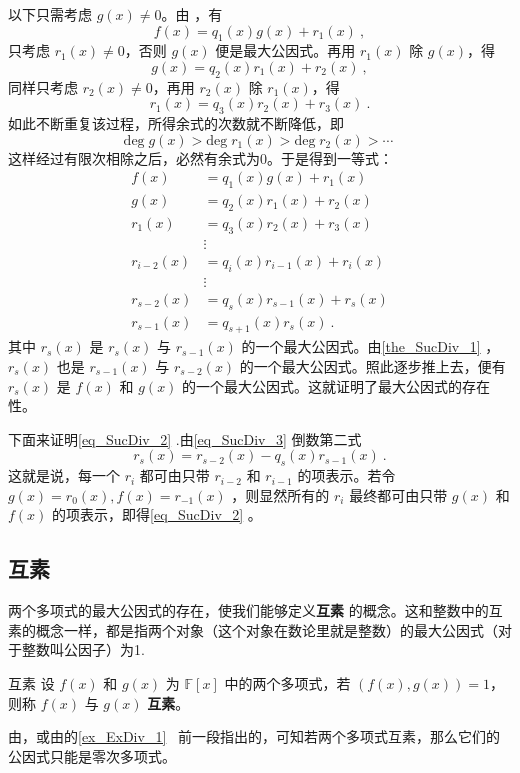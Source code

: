 以下只需考虑 $g(x)\neq 0$。由 ，有
\begin{equation}
f(x)=q_1(x)g(x)+r_1(x)~,
\end{equation}
只考虑 $r_1(x)\neq 0$，否则 $g(x)$ 便是最大公因式。再用 $r_1(x)$ 除 $g(x)$，得
\begin{equation}
g(x)=q_2(x)r_1(x)+r_2(x)~,
\end{equation}
同样只考虑 $r_2(x)\neq0$，再用 $r_2(x)$ 除 $r_1(x)$，得
\begin{equation}
r_1(x)=q_3(x)r_2(x)+r_3(x)~.
\end{equation}
如此不断重复该过程，所得余式的次数就不断降低，即
\begin{equation}
\mathrm{deg}\;g(x)>\mathrm{deg}\;r_1(x)>\mathrm{deg}\;r_2(x)>\cdots~
\end{equation}
这样经过有限次相除之后，必然有余式为0。于是得到一等式：
\begin{equation}\label{eq_SucDiv_3}
\begin{aligned}
f(x)&=q_1(x)g(x)+r_1(x)\\
g(x)&=q_2(x)r_1(x)+r_2(x)\\
r_1(x)&=q_3(x)r_2(x)+r_3(x)\\
&\vdots\\
r_{i-2}(x)&=q_i(x)r_{i-1}(x)+r_i(x)\\
&\vdots\\
r_{s-2}(x)&=q_s(x)r_{s-1}(x)+r_s(x)\\
r_{s-1}(x)&=q_{s+1}(x)r_s(x)~.
\end{aligned}
\end{equation}
其中 $r_s(x)$ 是 $r_s(x)$ 与 $r_{s-1}(x)$ 的一个最大公因式。由\autoref{the_SucDiv_1} ，$r_s(x)$ 也是 $r_{s-1}(x)$ 与 $r_{s-2}(x)$ 的一个最大公因式。照此逐步推上去，便有 $r_s(x)$ 是 $f(x)$ 和 $g(x)$ 的一个最大公因式。这就证明了最大公因式的存在性。

下面来证明\autoref{eq_SucDiv_2} .由\autoref{eq_SucDiv_3} 倒数第二式
\begin{equation}
r_s(x)=r_{s-2}(x)-q_s(x)r_{s-1}(x)~.
\end{equation}
这就是说，每一个 $r_i$ 都可由只带 $r_{i-2}$ 和 $r_{i-1}$ 的项表示。若令 $g(x)=r_0(x),f(x)=r_{-1}(x)$ ，则显然所有的 $r_i$ 最终都可由只带 $g(x)$ 和 $f(x)$ 的项表示，即得\autoref{eq_SucDiv_2} 。
\subsection{互素}
两个多项式的最大公因式的存在，使我们能够定义\textbf{互素} 的概念。这和整数中的互素的概念一样，都是指两个对象（这个对象在数论里就是整数）的最大公因式（对于整数叫公因子）为1.
\begin{definition}{互素}
设 $f(x)$ 和 $g(x)$ 为 $\mathbb{F}[x]$ 中的两个多项式，若 $(f(x),g(x))=1$，则称 $f(x)$ 与 $g(x)$ \textbf{互素}。
\end{definition}
由，或由的\autoref{ex_ExDiv_1}~ 前一段指出的，可知若两个多项式互素，那么它们的公因式只能是零次多项式。


